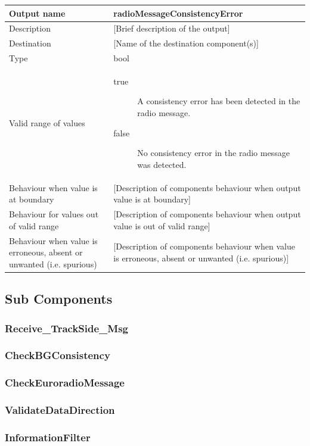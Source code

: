 \begin{longtable}{p{}p{}}
\toprule
Output name				& radioMessageConsistencyError \\
\midrule
Description				& [Brief description of the output] \\
\midrule
Destination				& [Name of the destination component(s)] \\ 
\midrule
Type					& bool \\
\midrule
Valid range of values	& \begin{description}
\item[true] A consistency error has been detected in the radio message.
\item[false] No consistency error in the radio message was detected.
\end{description} \\
\midrule
Behaviour when value is at boundary	& [Description of components behaviour when output value is at boundary] \\
\midrule
Behaviour for values out of valid range	& [Description of components behaviour when output value is out of valid range] \\
\midrule
Behaviour when value is erroneous, absent or unwanted (i.e. spurious) & [Description of components behaviour when value is erroneous, absent or unwanted (i.e. spurious)] \\
\bottomrule
\end{longtable}


\subsection{Sub Components}\label{s:receivetrackdata_subcomponents}

\subsubsection{Receive\_TrackSide\_Msg}


\subsubsection{CheckBGConsistency}


\subsubsection{CheckEuroradioMessage}


\subsubsection{ValidateDataDirection}


\subsubsection{InformationFilter}

